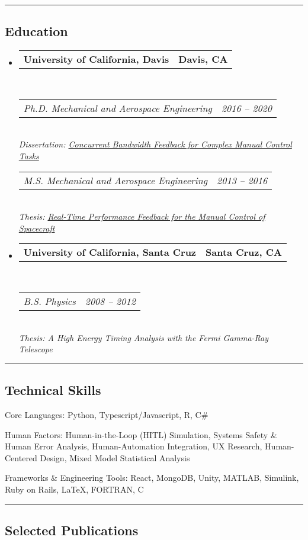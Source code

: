 \documentclass[10pt,letterpaper]{article}
\makeatletter
\newenvironment{indentsection}[1]%
{\begin{list}{}%
	{\setlength{\leftmargin}{#1}}%
	\item[]%
}
{\end{list}}
\newcommand{\headerrow}[2]
{\begin{tabular*}{\linewidth}{l@{\extracolsep{\fill}}r}
	#1 &
	#2 \\
\end{tabular*}}
\newcommand{\CPP}
{C\nolinebreak[4]\hspace{-.05em}\raisebox{.22ex}{\footnotesize\bf ++}}
\makeatother
\begin{document}
\hrule
\vspace{-0.5em}
\subsection*{Education}

\begin{itemize}
	\parskip=0.1em
	\item
	      \headerrow
	      {\textbf{University of California, Davis}}
	      {\textbf{Davis, CA}}
	      \\
	      \headerrow
	      {\emph{Ph.D. Mechanical and Aerospace Engineering}}
	      {\emph{2016 -- 2020}}
	      \\
	      \emph{Dissertation: \href{https://www.proquest.com/dissertations-theses/concurrent-bandwidth-feedback-complex-manual/docview/2449468766/se-2}{Concurrent Bandwidth Feedback for Complex Manual Control Tasks}}
	      \vspace{0.5em} %
	      \\
	      \headerrow
	      {\emph{M.S. Mechanical and Aerospace Engineering}}
	      {\emph{2013 -- 2016}}
	      \\
	      \emph{Thesis: \href{https://www.proquest.com/dissertations-theses/real-time-performance-feedback-manual-control/docview/1872339216/se-2}{Real-Time Performance Feedback for the Manual Control of Spacecraft}}
	\item
	      \headerrow
	      {\textbf{University of California, Santa Cruz}}
	      {\textbf{Santa Cruz, CA}}
	      \\
	      \headerrow
	      {\emph{B.S. Physics}}
	      {\emph{2008 -- 2012}}
	      \\
	      \emph{Thesis: A High Energy Timing Analysis with the Fermi Gamma-Ray Telescope}
\end{itemize}

\hrule
\vspace{-0.5em}
\subsection*{Technical Skills}

\begin{indentsection}{\parindent}
	\begin{description*}
		\item[Core Languages:] Python, Typescript/Javascript, R, C\# 
		\item[Human Factors:] Human-in-the-Loop (HITL) Simulation, Systems Safety \& Human Error Analysis, Human-Automation Integration, UX Research, Human-Centered Design, Mixed Model Statistical Analysis
		\item[Frameworks \& Engineering Tools:] React, MongoDB, Unity, MATLAB, Simulink, Ruby on Rails, \LaTeX, FORTRAN, \CPP
	\end{description*}
\end{indentsection}

\hrule
\vspace{-0.5em}
\subsection*{Selected Publications}

\nocite{*}
\renewcommand{\section}[2]{}%

\end{document}
